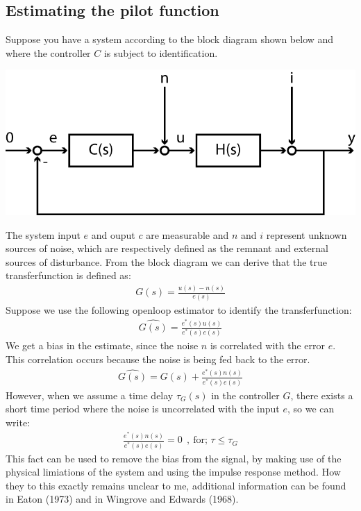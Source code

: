 \subsection{Estimating the pilot function}
Suppose you have a system according to the block diagram shown below and where the controller $C$ is subject to identification.
\begin{center}
		\includegraphics{images/eatonblock}
\end{center}
The system input $e$ and ouput $c$ are measurable and $n$ and $i$ represent unknown sources of noise, which are respectively defined as the remnant and external sources of disturbance.
From the block diagram we can derive that the true transferfunction is defined as:
\begin{align}
		G(s) = \frac{u(s)-n(s)}{e(s)}
\end{align}
Suppose we use the following openloop estimator to identify the transferfunction:
\begin{align}
		\hat{G(s)} = \frac{e^*(s)u(s)}{e^*(s)e(s)}
\end{align}
We get a bias in the estimate, since the noise $n$ is correlated with the error $e$. This correlation occurs because the noise is being fed back to the error. 
\begin{align}
		\hat{G(s)} = G(s) + \frac{e^*(s)n(s)}{e^*(s)e(s)}
\end{align}
However, when we assume a time delay $\tau_G(s)$ in the controller $G$, there exists a short time period where the noise is uncorrelated with the input $e$, so we can write:
\begin{align}
		\frac{e^*(s)n(s)}{e^*(s)e(s)} = 0 \ \ , \ \textrm{for; $\tau \leq \tau_G$}
\end{align}
This fact can be used to remove the bias from the signal, by making use of the physical limiations of the system and using the impulse response method. How they to this exactly remains unclear to me, additional information can be found in Eaton (1973) and in Wingrove and Edwards (1968).
